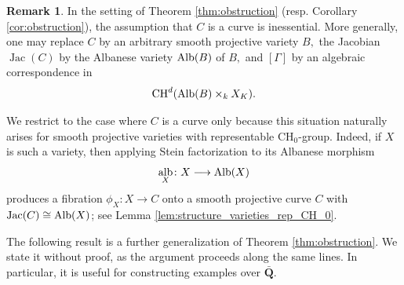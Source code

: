 \documentclass[11pt,letterpaper]{amsart}
\newcommand{\Alb}{\textnormal{Alb}}
\newcommand{\CH}{\textnormal{CH}}
\numberwithin{equation}{section}
\theoremstyle{definition}
\newtheorem{remark}[theorem]{Remark}
\theoremstyle{remark}
\newcommand{\bbQ}{\mathbf{Q}}
\DeclareMathOperator{\al}{alb}
\newcommand{\Ch}{\operatorname{CH_{0}}}
\DeclareMathOperator{\jac}{Jac}
\begin{document}
\begin{remark}\label{rem:base_fibration}
In the setting of Theorem \ref{thm:obstruction} (resp. Corollary \ref{cor:obstruction}), the assumption that $C$ is a curve is inessential. More generally, one may replace $C$ by an arbitrary smooth projective variety $B,$ the Jacobian $\jac(C)$ by the Albanese variety $\Alb(B)$ of $B,$ and $[\Gamma]$ by an algebraic correspondence in $$\CH^{d}(\Alb(B)\times_k X_{K}).$$ \par
We restrict to the case where $C$ is a curve only because this situation naturally arises for smooth projective varieties with representable $\Ch$-group. Indeed, if $X$ is such a variety, then applying Stein factorization to its Albanese morphism $$\al_{X}\colon X\longrightarrow\Alb(X)$$ produces a fibration $\phi_X \colon X \to C$ onto a smooth projective curve $C$ with $\jac(C) \cong \Alb(X)$; see Lemma \ref{lem:structure_varieties_rep_CH_0}.
\end{remark}

The following result is a further generalization of Theorem \ref{thm:obstruction}. We state it without proof, as the argument proceeds along the same lines. In particular, it is useful for constructing examples over $\bar{\bbQ}$.
\end{document}
